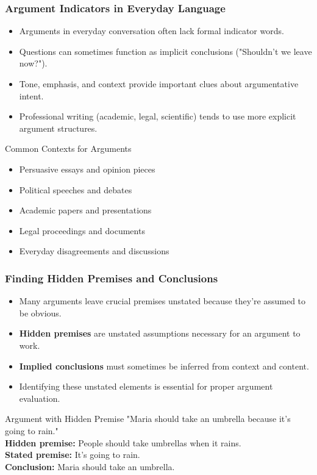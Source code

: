 \documentclass{beamer}
\begin{document}
\begin{frame}
    \frametitle{Argument Indicators in Everyday Language}
    \begin{itemize}
        \item Arguments in everyday conversation often lack formal indicator words.
        \item Questions can sometimes function as implicit conclusions ("Shouldn't we leave now?").
        \item Tone, emphasis, and context provide important clues about argumentative intent.
        \item Professional writing (academic, legal, scientific) tends to use more explicit argument structures.
    \end{itemize}
    
    \begin{block}{Common Contexts for Arguments}
        \begin{itemize}
            \item Persuasive essays and opinion pieces
            \item Political speeches and debates
            \item Academic papers and presentations
            \item Legal proceedings and documents
            \item Everyday disagreements and discussions
        \end{itemize}
    \end{block}
\end{frame}

\begin{frame}
    \frametitle{Finding Hidden Premises and Conclusions}
    \begin{itemize}
        \item Many arguments leave crucial premises unstated because they're assumed to be obvious.
        \item \textbf{Hidden premises} are unstated assumptions necessary for an argument to work.
        \item \textbf{Implied conclusions} must sometimes be inferred from context and content.
        \item Identifying these unstated elements is essential for proper argument evaluation.
    \end{itemize}
    
    \begin{exampleblock}{Argument with Hidden Premise}
        "Maria should take an umbrella because it's going to rain."\\
        \textbf{Hidden premise:} People should take umbrellas when it rains.\\
        \textbf{Stated premise:} It's going to rain.\\
        \textbf{Conclusion:} Maria should take an umbrella.
    \end{exampleblock}
\end{frame}
\end{document}

